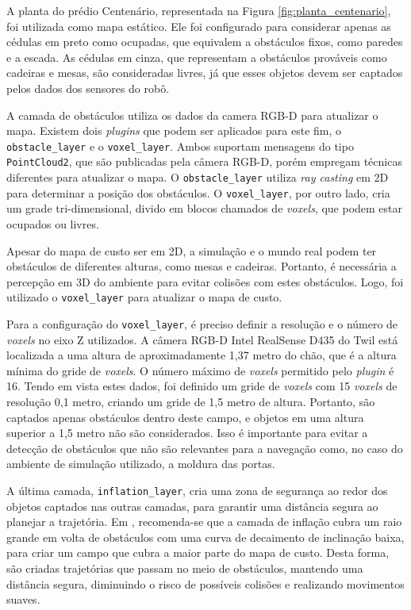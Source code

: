 \documentclass[repeatfields,xlists,xpacks,oneside,yearsonly]{ufrgscca}
\begin{document}
A planta do prédio Centenário, representada na Figura
\ref{fig:planta_centenario}, foi utilizada como mapa estático. Ele
foi configurado para considerar apenas as cédulas em preto como
ocupadas, que equivalem a obstáculos fixos, como paredes e a escada.
As cédulas em cinza, que representam a obstáculos prováveis como
cadeiras e mesas, são consideradas livres, já que esses objetos devem
ser captados pelos dados dos sensores do robô.

A camada de obstáculos utiliza os dados da camera RGB-D para
atualizar o mapa. Existem dois \textit{plugins} que podem ser
aplicados para este fim, o \texttt{obstacle\_layer} e o
\texttt{voxel\_layer}. Ambos suportam mensagens do tipo
\texttt{PointCloud2}, que são publicadas pela câmera RGB-D, porém
empregam técnicas diferentes para atualizar o mapa. O
\texttt{obstacle\_layer} utiliza \textit{ray casting} em 2D para
determinar a posição dos obstáculos. O \texttt{voxel\_layer}, por
outro lado, cria um grade tri-dimensional, divido em blocos chamados
de \textit{voxels}, que podem estar ocupados ou livres.

Apesar do mapa de custo ser em 2D, a simulação e o mundo real podem
ter obstáculos de diferentes alturas, como mesas e cadeiras.
Portanto, é necessária a percepção em 3D do ambiente para evitar
colisões com estes obstáculos. Logo, foi utilizado o
\texttt{voxel\_layer} para atualizar o mapa de custo.

Para a configuração do \texttt{voxel\_layer}, é preciso definir a
resolução e o número de \textit{voxels} no eixo Z utilizados. A
câmera RGB-D Intel RealSense D435 do Twil está localizada a uma
altura de aproximadamente 1,37 metro do chão, que é a altura mínima
do gride de \textit{voxels}. O número máximo de \textit{voxels}
permitido pelo \textit{plugin} é 16. Tendo em vista estes dados, foi
definido um gride de \textit{voxels} com 15 \textit{voxels} de
resolução 0,1 metro, criando um gride de 1,5 metro de altura.
Portanto, são captados apenas obstáculos dentro deste campo, e
objetos em uma altura superior a 1,5 metro não são considerados. Isso
é importante para evitar a detecção de obstáculos que não são
relevantes para a navegação como, no caso do ambiente de simulação
utilizado, a moldura das portas.

A última camada, \texttt{inflation\_layer}, cria uma zona de
segurança ao redor dos objetos captados nas outras camadas, para
garantir uma distância segura ao planejar a trajetória. Em
\textcite{ros_tuning_guide}, recomenda-se que a camada de inflação
cubra um raio grande em volta de obstáculos com uma curva de
decaimento de inclinação baixa, para criar um campo que cubra a maior
parte do mapa de custo. Desta forma, são criadas trajetórias que
passam no meio de obstáculos, mantendo uma distância segura,
diminuindo o risco de possíveis colisões e realizando movimentos
suaves.
\end{document}
